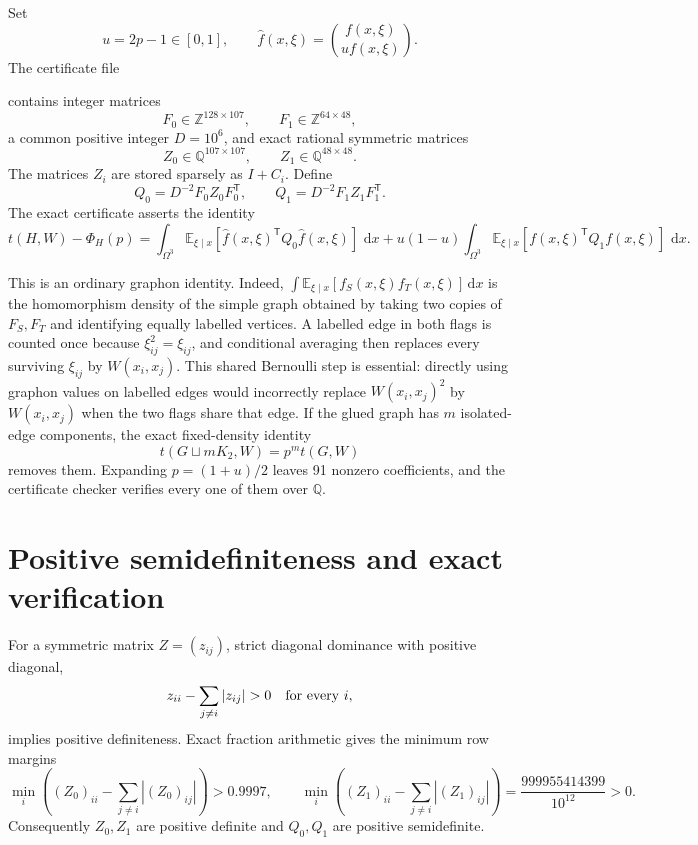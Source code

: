 \documentclass[11pt]{article}
\newcommand{\dd}{\,\mathrm d}
\begin{document}
Set
\[
 u=2p-1\in[0,1],\qquad
 \widehat f(x,\xi)=\binom{f(x,\xi)}{u f(x,\xi)}.
\]
The certificate file
\begin{center}
\end{center}
contains integer matrices
\[
 F_0\in\mathbb Z^{128\times107},\qquad
 F_1\in\mathbb Z^{64\times48},
\]
a common positive integer $D=10^6$, and exact rational symmetric matrices
\[
 Z_0\in\mathbb Q^{107\times107},\qquad
 Z_1\in\mathbb Q^{48\times48}.
\]
The matrices $Z_i$ are stored sparsely as $I+C_i$.  Define
\[
 Q_0=D^{-2}F_0Z_0F_0^{\mathsf T},\qquad
 Q_1=D^{-2}F_1Z_1F_1^{\mathsf T}.
\]
The exact certificate asserts the identity
\begin{equation}\label{eq:sos}
 \boxed{
 t(H,W)-\Phi_H(p)
 =\int_{\Omega^3}\mathbb E_{\xi\mid x}
   \left[\widehat f(x,\xi)^{\mathsf T}Q_0\widehat f(x,\xi)\right]\,\dd x
 +u(1-u)\int_{\Omega^3}\mathbb E_{\xi\mid x}
   \left[f(x,\xi)^{\mathsf T}Q_1f(x,\xi)\right]\,\dd x.}
\end{equation}

This is an ordinary graphon identity.  Indeed,
$\int\mathbb E_{\xi\mid x}[f_S(x,\xi)f_T(x,\xi)]\dd x$ is the homomorphism
density of the simple graph
obtained by taking two copies of $F_S,F_T$ and identifying equally labelled
vertices.  A labelled edge in both flags is counted once because
$\xi_{ij}^2=\xi_{ij}$, and conditional averaging then replaces every surviving
$\xi_{ij}$ by $W(x_i,x_j)$.  This shared Bernoulli step is essential: directly
using graphon values on labelled edges would incorrectly replace
$W(x_i,x_j)^2$ by $W(x_i,x_j)$ when the two flags share that edge.
If the glued graph has $m$ isolated-edge components, the exact
fixed-density identity
\[
 t(G\sqcup mK_2,W)=p^m t(G,W)
\]
removes them.  Expanding $p=(1+u)/2$ leaves 91 nonzero coefficients,
and the certificate checker verifies every one of them over $\mathbb Q$.

\section{Positive semidefiniteness and exact verification}

For a symmetric matrix $Z=(z_{ij})$, strict diagonal dominance with positive
diagonal,
\[
 z_{ii}-\sum_{j\ne i}|z_{ij}|>0\quad\hbox{for every }i,
\]
implies positive definiteness.  Exact fraction arithmetic gives the minimum
row margins
\[
 \min_i\left((Z_0)_{ii}-\sum_{j\ne i}|(Z_0)_{ij}|\right)
 >0.9997,
 \qquad
 \min_i\left((Z_1)_{ii}-\sum_{j\ne i}|(Z_1)_{ij}|\right)
 =\frac{999955414399}{10^{12}}>0.
\]
Consequently $Z_0,Z_1$ are positive definite and $Q_0,Q_1$ are positive
semidefinite.
\end{document}
